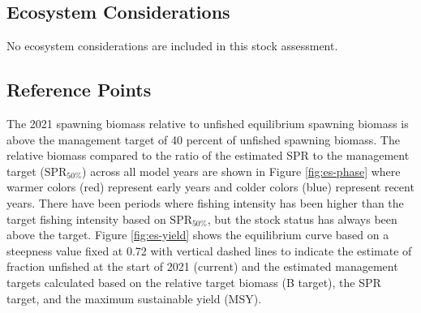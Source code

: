 \documentclass[11pt,
  english,
  a4paper,
]{article}
\begin{document}
\tagmcend\tagstructend

\clearpage


\hypertarget{ecosystem-considerations}{%
\subsection*{Ecosystem Considerations}\label{ecosystem-considerations}}

\leavevmode\tagmcend\tagstructend


No ecosystem considerations are included in this stock assessment.

\leavevmode\tagmcend\tagstructend\par


\hypertarget{reference-points}{%
\subsection*{Reference Points}\label{reference-points}}

\leavevmode\tagmcend\tagstructend


The 2021 spawning biomass relative to unfished equilibrium spawning biomass is above the management target of 40 percent of unfished spawning biomass. The relative biomass compared to the ratio of the estimated SPR to the management target ({\(\text{SPR}_{50\%}\)\leavevmode\tagmcend\tagstructend}) across all model years are shown in Figure \ref{fig:es-phase} where warmer colors (red) represent early years and colder colors (blue) represent recent years. There have been periods where fishing intensity has been higher than the target fishing intensity based on {\(\text{SPR}_{50\%}\)\leavevmode\tagmcend\tagstructend}, but the stock status has always been above the target. Figure \ref{fig:es-yield} shows the equilibrium curve based on a steepness value fixed at 0.72 with vertical dashed lines to indicate the estimate of fraction unfished at the start of 2021 (current) and the estimated management targets calculated based on the relative target biomass (B target), the SPR target, and the maximum sustainable yield (MSY).
\end{document}
